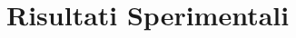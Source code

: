 \documentclass[12pt,a4paper,openright,twoside]{report}
\begin{document}

\tableofcontents %



\chapter{Risultati Sperimentali}




 
\end{document}
